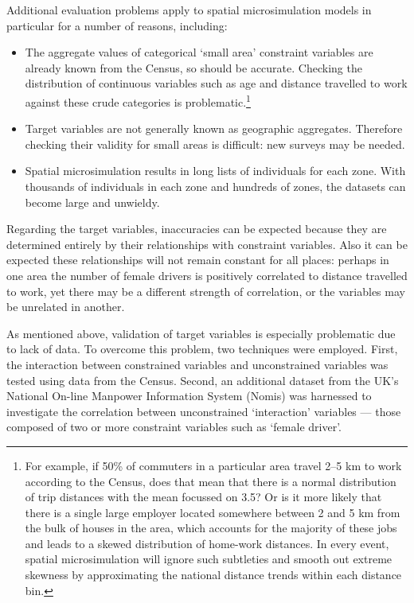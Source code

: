 \documentclass[a4paper, 11pt, twoside]{Thesis}
\begin{document}
Additional evaluation problems apply to spatial microsimulation models in
particular for a number of reasons, including:
\begin{itemize}
 \item The aggregate values of categorical `small area' constraint variables are already known from the Census, 
 so should be accurate. Checking the distribution of continuous variables such as 
 age and distance travelled to work against these crude categories is 
 problematic.\footnote{For example, if 50\% of
commuters in a particular area travel 2--5 km to work according to the Census,
does that mean that there is a normal distribution of trip distances with the
mean focussed on 3.5? Or is it more likely that there is a single large
employer located somewhere between 2 and 5 km from the bulk of houses in the
area, which accounts for the majority of these jobs and leads to a skewed
distribution of home-work distances. In every event, spatial microsimulation
will ignore such subtleties and smooth out extreme skewness by approximating the
national distance trends within each distance bin.
}
  \item Target variables are not generally known as geographic
aggregates. Therefore checking their validity for small areas is 
difficult: new surveys may be needed.
  \item Spatial microsimulation results in long lists of individuals for each
zone. With thousands of individuals in each zone and hundreds of zones, the
datasets can become large and unwieldy.
\end{itemize}

Regarding the target variables, inaccuracies can be expected because they are
determined entirely by their relationships with constraint variables. Also
it can be expected these relationships will not remain constant for all places:
perhaps in one area the number of female drivers is positively correlated to
distance travelled to work, yet there may be a different strength of
correlation, or the variables may be unrelated in another.

As mentioned above, validation of target variables is especially problematic
due to lack of data. To overcome this problem, two techniques were employed.
First, the interaction between constrained variables and unconstrained
variables was tested using data from the Census. Second, an additional dataset
from the UK's National On-line Manpower Information System
(Nomis) was harnessed to investigate the
correlation between unconstrained `interaction' variables --- those
composed of two or more constraint variables such as `female driver'.
\end{document}
